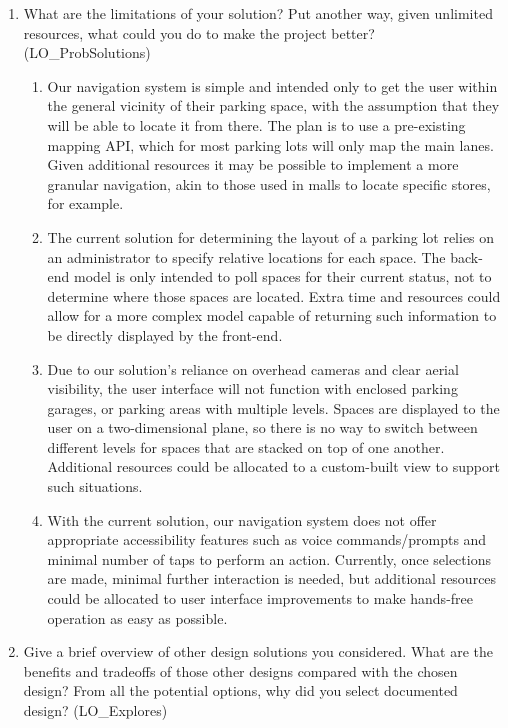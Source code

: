 \documentclass[12pt, titlepage]{article}
\begin{document}
\begin{enumerate}
  \item What are the limitations of your solution?  Put another way, given
  unlimited resources, what could you do to make the project better?
  (LO\_ProbSolutions)
  
  \begin{enumerate}
  \item Our navigation system is simple and intended only to get the user within
  the general vicinity of their parking space, with the assumption that they
  will be able to locate it from there. The plan is to use a pre-existing
  mapping API, which for most parking lots will only map the main lanes. Given
  additional resources it may be possible to implement a more granular
  navigation, akin to those used in malls to locate specific stores, for
  example.
  
  \item The current solution for determining the layout of a parking lot relies
  on an administrator to specify relative locations for each space. The back-end
  model is only intended to poll spaces for their current status, not to
  determine where those spaces are located. Extra time and resources could allow
  for a more complex model capable of returning such information to be directly
  displayed by the front-end.

  \item Due to our solution's reliance on overhead cameras and clear aerial
  visibility, the user interface will not function with enclosed parking
  garages, or parking areas with multiple levels. Spaces are displayed to the
  user on a two-dimensional plane, so there is no way to switch between
  different levels for spaces that are stacked on top of one another. Additional
  resources could be allocated to a custom-built view to support such
  situations.

  \item With the current solution, our navigation system does not offer
  appropriate accessibility features such as voice commands/prompts and minimal
  number of taps to perform an action. Currently, once selections are made,
  minimal further interaction is needed, but additional resources could be
  allocated to user interface improvements to make hands-free operation as easy
  as possible.

  \end{enumerate}
  
  \item Give a brief overview of other design solutions you considered.  What
  are the benefits and tradeoffs of those other designs compared with the chosen
  design?  From all the potential options, why did you select documented design?
  (LO\_Explores)
  

\end{enumerate}
\end{document}
